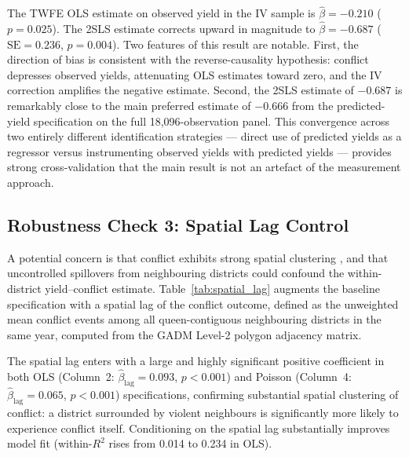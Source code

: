 The TWFE OLS estimate on observed yield in the IV sample is $\hat{\beta} = -0.210$ ($p = 0.025$). The 2SLS estimate corrects upward in magnitude to $\hat{\beta} = -0.687$ ($\text{SE} = 0.236$, $p = 0.004$). Two features of this result are notable. First, the direction of bias is consistent with the reverse-causality hypothesis: conflict depresses observed yields, attenuating OLS estimates toward zero, and the IV correction amplifies the negative estimate. Second, the 2SLS estimate of $-0.687$ is remarkably close to the main preferred estimate of $-0.666$ from the predicted-yield specification on the full 18,096-observation panel. This convergence across two entirely different identification strategies --- direct use of predicted yields as a regressor versus instrumenting observed yields with predicted yields --- provides strong cross-validation that the main result is not an artefact of the measurement approach.

\subsection{Robustness Check 3: Spatial Lag Control}

A potential concern is that conflict exhibits strong spatial clustering \citep{HarariLaFerrara2018}, and that uncontrolled spillovers from neighbouring districts could confound the within-district yield--conflict estimate. Table~\ref{tab:spatial_lag} augments the baseline specification with a spatial lag of the conflict outcome, defined as the unweighted mean conflict events among all queen-contiguous neighbouring districts in the same year, computed from the GADM Level-2 polygon adjacency matrix.

\begin{table}[H]
\centering
\caption{Robustness Check: Spatial Lag of Conflict}
\label{tab:spatial_lag}
\begin{threeparttable}

\end{threeparttable}
\end{table}

The spatial lag enters with a large and highly significant positive coefficient in both OLS (Column~2: $\hat{\beta}_\text{lag} = 0.093$, $p < 0.001$) and Poisson (Column~4: $\hat{\beta}_\text{lag} = 0.065$, $p < 0.001$) specifications, confirming substantial spatial clustering of conflict: a district surrounded by violent neighbours is significantly more likely to experience conflict itself. Conditioning on the spatial lag substantially improves model fit (within-$R^2$ rises from 0.014 to 0.234 in OLS).

